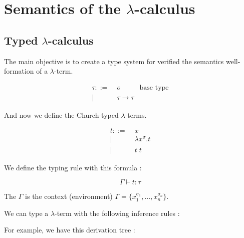 \section{Semantics of the $\lambda$-calculus}

  \subsection{Typed $\lambda$-calculus}

  The main objective is to create a type system for verified the semantics
  well-formation of a $\lambda$-term.

  \begin{align*}
    \tau ::=&\; o & \text{base type} \\
        |&\; \tau \to \tau
  \end{align*}

  And now we define the Church-typed $\lambda$-terms.
  
  \begin{align*}
    t ::=&\; x \\
      |&\; \lambda x^\sigma. t \\
      |&\; t\;t
  \end{align*}

  We define the typing rule with this formula :

  $$\Gamma \vdash t : \tau$$

  The $\Gamma$ is the context (environment) $\Gamma = \{x_1^{\sigma_1}, \ldots,
  x_n^{\sigma_n}\}$.

  We can type a $\lambda$-term with the following inference rules :


  For example, we have this derivation tree :

